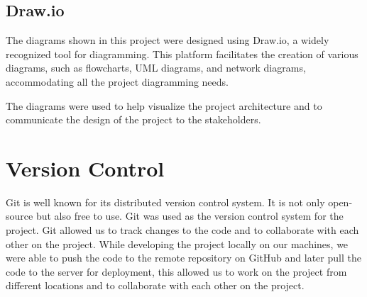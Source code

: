\subsection{Draw.io}

The diagrams shown in this project were designed using Draw.io, a widely recognized tool for diagramming. This platform facilitates the creation of various 
diagrams, such as flowcharts, UML diagrams, and network diagrams, accommodating all the project diagramming needs.

The diagrams were used to help visualize the project architecture and to communicate the design of the
project to the stakeholders.

\section{Version Control}

Git is well known for its distributed version control system. It is not only open-source but also free to use.
Git was used as the version control system for the project. Git allowed us to track changes to the code and to collaborate with each other on the project.
While developing the project locally on our machines, we were able to push the code to the remote repository on GitHub and later pull the code to the server
for deployment, this allowed us to work on the project from different locations and to collaborate with each other on the project.